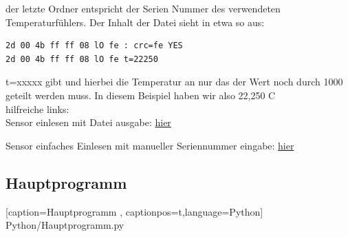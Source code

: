 \documentclass[4paper,0pt]{article}
\begin{document}
der letzte Ordner entspricht der Serien Nummer des verwendeten Temperaturfühlers. Der Inhalt der Datei sieht in etwa so aus:

\begin{shaded}
\begin{lstlisting}
2d 00 4b ff ff 08 lO fe : crc=fe YES
2d 00 4b ff ff 08 lO fe t=22250
\end{lstlisting}
\end{shaded}

t=xxxxx gibt und hierbei die Temperatur an nur das der Wert noch durch 1000 geteilt werden muss. In diesem Beispiel haben wir also 22,250 C\\

hilfreiche links:\\

Sensor einlesen mit Datei ausgabe:
\href{http://www.gtkdb.de/index_31_2040.html}{hier}

Sensor einfaches Einlesen mit manueller Seriennummer eingabe:
\href{http://www.cl.cam.ac.uk/projects/raspberrypi/tutorials/temperature/}{hier}

\subsection{Hauptprogramm}

\begin{shaded}

    [caption={Hauptprogramm}
       \label{lst:python},
       captionpos=t,language=Python]
{Python/Hauptprogramm.py}
\end{shaded}
\end{document}
